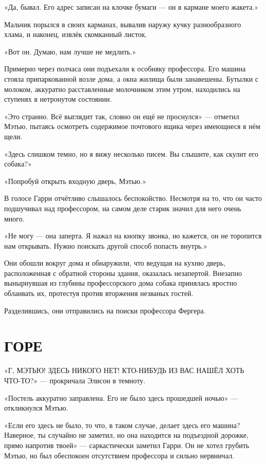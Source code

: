 \documentclass[a5paper, 9pt,
final, openany, twoside=true]{memoir}
\begin{document}
«Да, бывал. Его адрес записан на клочке бумаги — он в кармане моего жакета.»

Мальчик порылся в своих карманах, вывалив наружу кучку разнообразного хлама, и наконец, извлёк скомканный листок.

«Вот он. Думаю, нам лучше не медлить.»\bigskip
	
Примерно через полчаса они подъехали к особняку профессора. Его машина стояла припаркованной возле дома, а окна жилища были занавешены. Бутылки с молоком, аккуратно расставленные молочником этим утром, находились на ступенях в нетронутом состоянии.

«Это странно. Всё выглядит так, словно он ещё не проснулся» — отметил Мэтью, пытаясь осмотреть содержимое почтового ящика через имеющиеся в нём щели.

«Здесь слишком темно, но я вижу несколько писем. Вы слышите, как скулит его собака?»

«Попробуй открыть входную дверь, Мэтью.»

В голосе Гарри отчётливо слышалось беспокойство. Несмотря на то, что он часто подшучивал над профессором, на самом деле старик значил для него очень много.

«Не могу — она заперта. Я нажал на кнопку звонка, но кажется, он не торопится нам открывать. Нужно поискать другой способ попасть внутрь.»

Они обошли вокруг дома и обнаружили, что ведущая на кухню дверь, расположенная с обратной стороны здания, оказалась незапертой. Внезапно вынырнувшая из глубины профессорского дома собака принялась яростно облаивать их, протестуя против вторжения незваных гостей.

Разделившись, они отправились на поиски профессора Фергера.
\chapter{ГОРЕ}
«Г{, МЭТЬЮ! ЗДЕСЬ НИКОГО НЕТ!  КТО-НИБУДЬ ИЗ ВАС НАШЁЛ ХОТЬ ЧТО-ТО?}» — прокричала Элисон в темноту.

«Постель аккуратно заправлена. Его не было здесь прошедшей ночью» — откликнулся Мэтью.

«Если его здесь не было, то что, в таком случае, делает здесь его машина? Наверное, ты случайно не заметил, но она находится на подъездной дорожке, прямо напротив твоей» — саркастически заметил Гарри. Он не хотел грубить Мэтью, но был обеспокоен отсутствием профессора и сильно нервничал.
\end{document}
